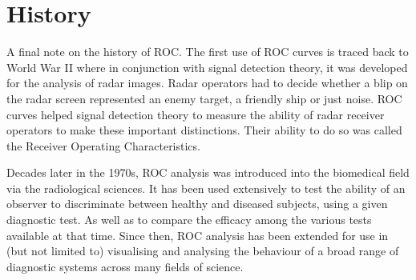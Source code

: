 \section{History}
A final note on the history of ROC. The first use of ROC curves is traced back to World War II where in conjunction with signal detection theory, it was developed for the analysis of radar images. Radar operators had to decide whether a blip on the radar screen represented an enemy target, a friendly ship or just noise. ROC curves helped signal detection theory to measure the ability of radar receiver operators to make these important distinctions. Their ability to do so was called the Receiver Operating Characteristics. 

Decades later in the 1970s, ROC analysis was introduced into the biomedical field via the radiological sciences. It has been used extensively to test the ability of an observer to discriminate between healthy and diseased subjects, using a given diagnostic test. As well as to compare the efficacy among the various tests available at that time. Since then, ROC analysis has been extended for use in (but not limited to) visualising and analysing the behaviour of a broad range of diagnostic systems across many fields of science. 

